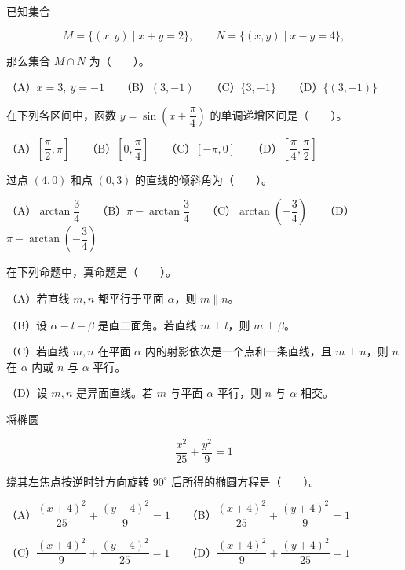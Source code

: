 \begin{question}
已知集合

\nopagebreak[4]
\[
M=\{(x,y)\mid x+y=2\},\qquad N=\{(x,y)\mid x-y=4\},
\]

那么集合 $M\cap N$ 为\mbox{（　　）}。

（A）$x=3,\ y=-1$　　（B）$(3,-1)$　　（C）$\{3,-1\}$　　（D）$\{(3,-1)\}$

\end{question}
\begin{question}
在下列各区间中，函数 $y=\sin\left(x+\dfrac{\pi}{4}\right)$ 的单调递增区间是\mbox{（　　）}。

（A）$\left[\dfrac{\pi}{2},\pi\right]$　　（B）$\left[0,\dfrac{\pi}{4}\right]$　　（C）$[-\pi,0]$　　（D）$\left[\dfrac{\pi}{4},\dfrac{\pi}{2}\right]$

\end{question}
\begin{question}
过点 $(4,0)$ 和点 $(0,3)$ 的直线的倾斜角为\mbox{（　　）}。

（A）$\arctan\dfrac{3}{4}$　　（B）$\pi-\arctan\dfrac{3}{4}$　　（C）$\arctan\left(-\dfrac{3}{4}\right)$　　（D）$\pi-\arctan\left(-\dfrac{3}{4}\right)$

\end{question}
\begin{question}
在下列命题中，真命题是\mbox{（　　）}。

（A）若直线 $m,n$ 都平行于平面 $\alpha$，则 $m\parallel n$。

（B）设 $\alpha-l-\beta$ 是直二面角。若直线 $m\perp l$，则 $m\perp\beta$。

（C）若直线 $m,n$ 在平面 $\alpha$ 内的射影依次是一个点和一条直线，且 $m\perp n$，则 $n$ 在 $\alpha$ 内或 $n$ 与 $\alpha$ 平行。

（D）设 $m,n$ 是异面直线。若 $m$ 与平面 $\alpha$ 平行，则 $n$ 与 $\alpha$ 相交。

\end{question}
\begin{question}
将椭圆

\nopagebreak[4]
\[
\dfrac{x^2}{25}+\dfrac{y^2}{9}=1
\]

绕其左焦点按逆时针方向旋转 $90^\circ$ 后所得的椭圆方程是\mbox{（　　）}。

（A）$\dfrac{(x+4)^2}{25}+\dfrac{(y-4)^2}{9}=1$　　（B）$\dfrac{(x+4)^2}{25}+\dfrac{(y+4)^2}{9}=1$

（C）$\dfrac{(x+4)^2}{9}+\dfrac{(y-4)^2}{25}=1$　　（D）$\dfrac{(x+4)^2}{9}+\dfrac{(y+4)^2}{25}=1$

\end{question}
